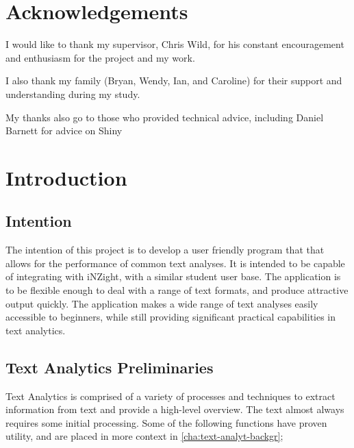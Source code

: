 \message{ !name(jason-cairns-dissertation.tex)}\documentclass[11pt, a4paper, titlepage]{report}
\begin{document}
\setcounter{page}{1}
\chapter*{Acknowledgements}\label{cha:acknowledgements}

I would like to thank my supervisor, Chris Wild, for his constant
encouragement and enthusiasm for the project and my work.

I also thank my family (Bryan, Wendy, Ian, and Caroline) for their
support and understanding during my study.

My thanks also go to those who provided technical advice, including
Daniel Barnett for advice on Shiny



\tableofcontents
{}
\listoflistings{}
\listoftables
{}
\listoffigures

\chapter{Introduction}\label{cha:introduction}
\setcounter{page}{1}
\section{Intention}\label{sec:intention}

The intention of this project is to develop a user friendly program
that that allows for the performance of common text analyses. It is
intended to be capable of integrating with iNZight, with a similar
student user base. The application is to be flexible enough to deal
with a range of text formats, and produce attractive output quickly.
The application makes a wide range of text analyses easily accessible
to beginners, while still providing significant practical capabilities
in text analytics.
  
\section{Text Analytics Preliminaries}\label{sec:backgr-text-analyt}

Text Analytics is comprised of a variety of processes and techniques
to extract information from text and provide a high-level overview.
The text almost always requires some initial processing. Some of the
following functions have proven utility, and are placed in more
context in \cref{cha:text-analyt-backgr};
\end{document}
